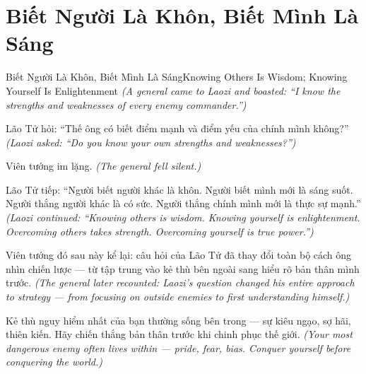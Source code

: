 \section{Biết Người Là Khôn, Biết Mình Là Sáng}
\begin{truyen}{Biết Người Là Khôn, Biết Mình Là Sáng}{Knowing Others Is Wisdom; Knowing Yourself Is Enlightenment}
\textit{(A general came to Laozi and boasted: ``I know the strengths and weaknesses of every enemy commander.'')}

Lão Tử hỏi: ``Thế ông có biết điểm mạnh và điểm yếu của chính mình không?''
\textit{(Laozi asked: ``Do you know your own strengths and weaknesses?'')}

Viên tướng im lặng.
\textit{(The general fell silent.)}

Lão Tử tiếp: ``Người biết người khác là khôn. Người biết mình mới là sáng suốt. Người thắng người khác là có sức. Người thắng chính mình mới là thực sự mạnh.''
\textit{(Laozi continued: ``Knowing others is wisdom. Knowing yourself is enlightenment. Overcoming others takes strength. Overcoming yourself is true power.'')}

Viên tướng đó sau này kể lại: câu hỏi của Lão Tử đã thay đổi toàn bộ cách ông nhìn chiến lược — từ tập trung vào kẻ thù bên ngoài sang hiểu rõ bản thân mình trước.
\textit{(The general later recounted: Laozi's question changed his entire approach to strategy — from focusing on outside enemies to first understanding himself.)}

\end{truyen}

\begin{baihoc}
Kẻ thù nguy hiểm nhất của bạn thường sống bên trong — sự kiêu ngạo, sợ hãi, thiên kiến. Hãy chiến thắng bản thân trước khi chinh phục thế giới.
\textit{(Your most dangerous enemy often lives within — pride, fear, bias. Conquer yourself before conquering the world.)}
\end{baihoc}
\ngancach

